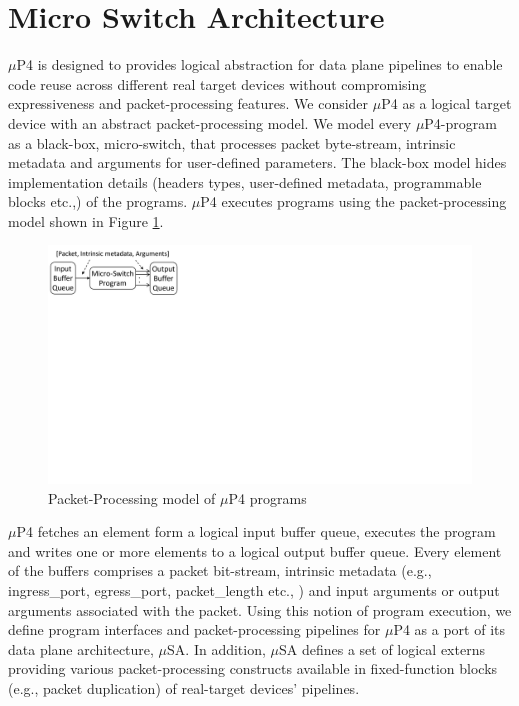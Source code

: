 \section{Micro Switch Architecture}
\label{section:micro-switch-architecture}
$\mu$P4 is designed to provides logical abstraction for data plane pipelines to enable code reuse across different real target devices without compromising expressiveness and packet-processing features.
We consider $\mu$P4 as a logical target device with an abstract packet-processing model.
We model every $\mu$P4-program as a black-box, micro-switch, that processes packet byte-stream, intrinsic metadata and arguments for user-defined parameters.
The black-box model hides implementation details (headers types, user-defined metadata, programmable blocks etc.,) of the programs.
$\mu$P4 executes programs using the packet-processing model shown in Figure \ref{fig:mp4-packet-processing-model}.
\begin{figure}
    \centering
    \includegraphics[trim=0 420 667 0, clip, scale=0.5]{microp4-program-model}
    \caption{Packet-Processing model of $\mu$P4 programs}
    \label{fig:mp4-packet-processing-model}
\end{figure}
$\mu$P4 fetches an element form a logical input buffer queue, executes the program and writes one or more elements to a logical output buffer queue.
Every element of the buffers comprises a packet bit-stream, intrinsic metadata (e.g., ingress\_port, egress\_port, packet\_length etc., ) and input arguments or output arguments associated with the packet.
Using this notion of program execution, we define program interfaces and packet-processing pipelines for $\mu$P4 as a port of its data plane architecture, $\mu$SA.
In addition, $\mu$SA defines a set of logical externs providing various packet-processing constructs available in fixed-function blocks (e.g., packet duplication) of real-target devices' pipelines.


